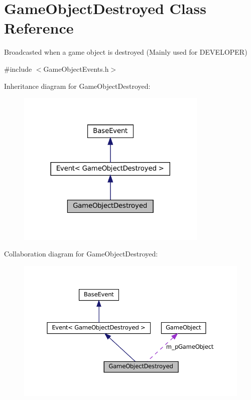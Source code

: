 \hypertarget{classGameObjectDestroyed}{}\section{Game\+Object\+Destroyed Class Reference}
\label{classGameObjectDestroyed}


Broadcasted when a game object is destroyed (Mainly used for D\+E\+V\+E\+L\+O\+P\+ER)  




{\ttfamily \#include $<$Game\+Object\+Events.\+h$>$}



Inheritance diagram for Game\+Object\+Destroyed\+:\nopagebreak
\begin{figure}[H]
\begin{center}
\leavevmode
\includegraphics[width=258pt]{classGameObjectDestroyed__inherit__graph}
\end{center}
\end{figure}


Collaboration diagram for Game\+Object\+Destroyed\+:\nopagebreak
\begin{figure}[H]
\begin{center}
\leavevmode
\includegraphics[width=350pt]{classGameObjectDestroyed__coll__graph}
\end{center}
\end{figure}
